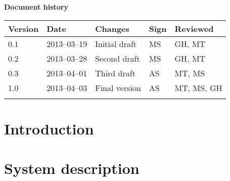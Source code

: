 \documentclass[10pt, a4paper, twoside]{article}
\numberwithin{equation}{subsection}
\numberwithin{figure}{section}
\numberwithin{table}{section}
\begin{document}



\newpage
\pagestyle{fancy}
\setcounter{page}{2} %




\newpage
\tableofcontents
\listoffigures



\newpage
\vspace*{5\baselineskip}

\begin{center}
\textbf{\LARGE Document history}

{ \footnotesize 
\begin{tabular}{|p{1cm}|p{2.0cm}|p{5cm}|p{1.5cm}|p{2cm}|}
	\hline
	\textbf{Version} & \textbf{Date} & \textbf{Changes} & \textbf{Sign} & \textbf{Reviewed} \\
	
	\hline
	0.1 & 2013--03--19 & Initial draft & MS & GH, MT\\
	
	\hline
	0.2 & 2013--03--28 & Second draft & MS & GH, MT\\
	
	\hline
	0.3 & 2013--04--01 & Third draft & AS & MT, MS\\
	
	\hline
	1.0 & 2013--04--03 & Final version & AS & MT, MS, GH\\
	
	\hline
	 &  &  &  &  \\
	
	\hline
\end{tabular}
}
\end{center}





%
%
\newpage
{}

\newpage
\section{Introduction}


\section{System description}
\label{sec:system_description}

\end{document}
